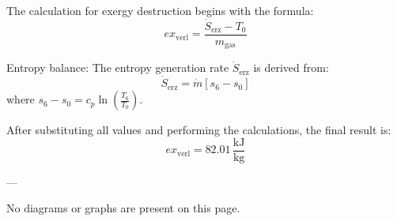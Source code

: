 The calculation for exergy destruction begins with the formula:  
\[
ex_{\text{verl}} = \frac{\dot{S}_{\text{erz}} - T_0}{m_{\text{gas}}}
\]  

Entropy balance:  
The entropy generation rate \( \dot{S}_{\text{erz}} \) is derived from:  
\[
\dot{S}_{\text{erz}} = \dot{m} \left[ s_6 - s_0 \right]
\]  
where \( s_6 - s_0 = c_p \ln \left( \frac{T_6}{T_0} \right) \).  

After substituting all values and performing the calculations, the final result is:  
\[
ex_{\text{verl}} = 82.01 \, \frac{\text{kJ}}{\text{kg}}
\]  

---

No diagrams or graphs are present on this page.